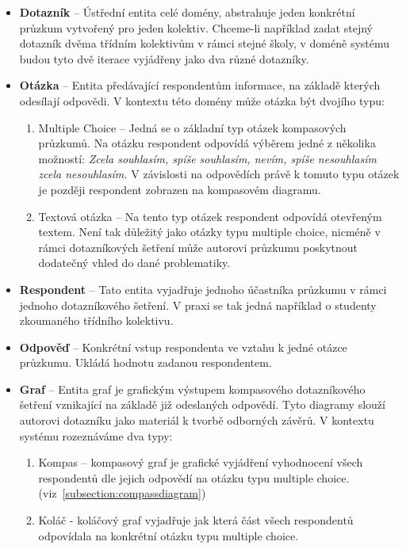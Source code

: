 \begin{itemize}
    \item \textbf{Dotazník} – Ústřední entita celé domény, abstrahuje jeden konkrétní průzkum vytvořený pro jeden kolektiv.
    Chceme-li například zadat stejný dotazník dvěma třídním kolektivům v rámci stejné školy,
    v doméně systému budou tyto dvě iterace vyjádřeny jako dva různé dotazníky.
    
    \item \textbf{Otázka} – Entita předávající respondentům informace, na základě 
    kterých odesílají odpovědi. V kontextu této domény může otázka být dvojího typu:
    \begin{enumerate}
        \item{Multiple Choice} – Jedná se o základní typ otázek kompasových průzkumů. Na otázku respondent odpovídá výběrem 
        jedné z několika možností: \textit{Zcela souhlasím, spíše souhlasím, nevím, spíše nesouhlasím
        zcela nesouhlasím.} V závislosti na odpovědích právě k tomuto typu otázek je později respondent 
        zobrazen na kompasovém diagramu.

        \item{Textová otázka} – Na tento typ otázek respondent odpovídá otevřeným textem. Není tak 
        důležitý jako otázky typu multiple choice, nicméně v rámci dotazníkových šetření může autorovi průzkumu
        poskytnout dodatečný vhled do dané problematiky.
    \end{enumerate}
    \item \textbf{Respondent} – Tato entita vyjadřuje jednoho účastníka průzkumu v rámci jednoho dotazníkového 
    šetření. V praxi se tak jedná například o studenty zkoumaného třídního kolektivu.
    \item \textbf{Odpověď} – Konkrétní vstup respondenta ve vztahu k jedné otázce průzkumu. Ukládá hodnotu zadanou respondentem.
    \item \textbf{Graf} – Entita graf je grafickým výstupem kompasového dotazníkového šetření 
    vznikající na základě již odeslaných odpovědí. Tyto diagramy slouží autorovi dotazníku jako materiál k tvorbě odborných závěrů. V kontextu systému rozeznáváme dva typy:
    \begin{enumerate}
        \item Kompas – kompasový graf je grafické vyjádření vyhodnocení všech respondentů dle jejich odpovědí na otázku typu multiple choice. (viz~\ref{subsection:compassdiagram})
        \item Koláč - koláčový graf vyjadřuje jak která část všech respondentů odpovídala na konkrétní otázku typu multiple choice.
    \end{enumerate}
\end{itemize}

